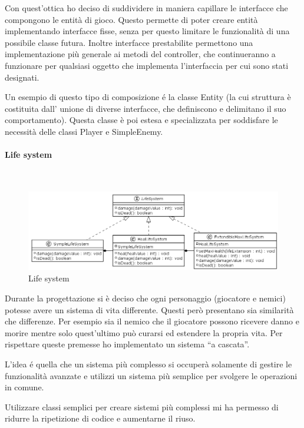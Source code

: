 \documentclass[a4paper,titlepage,12pt]{article}
\begin{document}
\par \noindent Con quest’ottica ho deciso di suddividere in maniera capillare le interfacce che compongono le entità di gioco.  Questo permette di poter creare entità implementando interfacce fisse, senza per questo limitare le funzionalità di una possibile classe futura. Inoltre interfacce prestabilite permettono una implementazione più generale ai metodi del controller, che continueranno a funzionare per qualsiasi oggetto che implementa l’interfaccia per cui sono stati designati.  
\par \noindent Un esempio di questo tipo di composizione é la classe Entity (la cui struttura è costituita dall’ unione di diverse interfacce, che definiscono e delimitano il suo comportamento). Questa classe è poi estesa e specializzata per soddisfare le necessità delle classi Player e SimpleEnemy.

\paragraph{Life system}
\par \noindent \\
\begin{figure}[H]
    \centering
    \includegraphics[scale=0.45]{img/uml/LifeSystem.png}
    \caption{Life system}
    \label{fig: Life system}
\end{figure}
\par \noindent Durante la progettazione si è deciso che ogni personaggio (giocatore e nemici) potesse avere un sistema di vita differente. Questi però presentano sia similarità che differenze. Per esempio sia il nemico che il giocatore possono ricevere danno e morire mentre solo quest’ultimo può curarsi ed estendere la propria vita. 
Per rispettare queste premesse ho implementato un sistema “a cascata”. 
\par \noindent L’idea é quella che un sistema più complesso si occuperà solamente di gestire le funzionalità avanzate e utilizzi un sistema più semplice per svolgere le operazioni in comune. 
\par \noindent Utilizzare classi semplici per creare sistemi più complessi mi ha permesso di ridurre la ripetizione di codice e aumentarne il riuso. 
\end{document}

